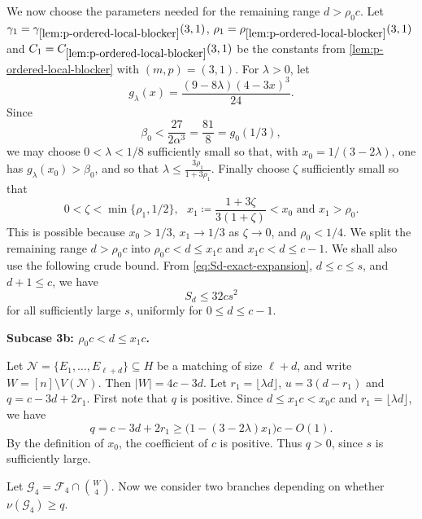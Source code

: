 \documentclass[10pt,a4paper]{article}
\numberwithin{equation}{section}
\theoremstyle{definition}
\newcommand{\F}{\mathcal F}
\newcommand{\G}{\mathcal G}
\begin{document}
\medskip

We now choose the parameters needed for the remaining range $d>\rho_0 c$.
Let $\gamma_1=\gamma_{\ref{lem:p-ordered-local-blocker}}(3,1)$, $\rho_1=\rho_{\ref{lem:p-ordered-local-blocker}}(3,1)$ and $C_1=C_{\ref{lem:p-ordered-local-blocker}}(3,1)$ be the constants from \cref{lem:p-ordered-local-blocker} with $(m,p)=(3,1)$.
For $\lambda>0$, let
\[
        g_\lambda(x)=\frac{(9-8\lambda)(4-3x)^3}{24}.
\]
Since
\[
        \beta_0
        <\frac{27}{2\alpha^3}
        =\frac{81}{8}=g_0(1/3),
\]
we may choose $0<\lambda<1/8$ sufficiently small so that, with $x_0=1/(3-2\lambda)$, one has $g_\lambda(x_0)>\beta_0$, and so that $\lambda\le \frac{3\rho_1}{1+3\rho_1}$.
Finally choose $\zeta$ sufficiently small so that
\[
        0<\zeta<\min\{\rho_1,1/2\}, \text{ }
        x_1\coloneqq\frac{1+3\zeta}{3(1+\zeta)}<x_0
        \text{ and }x_1>\rho_0 .
\]
This is possible because $x_0>1/3$, $x_1\to1/3$ as $\zeta\to0$, and $\rho_0<1/4$.
We split the remaining range $d>\rho_0 c$ into $\rho_0 c<d\le x_1c$ and $x_1c<d\le c-1$.
We shall also use the following crude bound. From \eqref{eq:Sd-exact-expansion}, $d\le c\le s$, and $d+1\le c$, we have
\begin{equation}\label{eq:Sd-crude-cs2}
        S_d\le 32cs^2
\end{equation}
for all sufficiently large $s$, uniformly for $0\le d\le c-1$.

\medskip
\noindent\textbf{Subcase 3b: $\rho_0 c< d\le x_1c$.}
\medskip

Let $\mathcal N=\{E_1,\ldots,E_{\ell+d}\}\subseteq H$ be a matching of size $\ell+d$, and write $W=[n]\setminus V(\mathcal N)$.
Then $|W|=4c-3d$.
Let $r_1=\lfloor\lambda d\rfloor$, $u=3(d-r_1)$ and $q=c-3d+2r_1$.
First note that $q$ is positive. Since $d\le x_1c<x_0c$ and $r_1=\lfloor\lambda d\rfloor$, we have
\[
        q=c-3d+2r_1
        \ge \bigl(1-(3-2\lambda)x_1\bigr)c-O(1).
\]
By the definition of $x_0$, the coefficient of $c$ is positive. Thus $q>0$, since $s$ is sufficiently large.

Let $\G_4=\F_4\cap\binom W4$.
Now we consider two branches depending on whether $\nu(\G_4)\ge q$.

\medskip
\noindent{\bf First branch: $\nu(\G_4)\ge q$.}
\medskip
\end{document}
